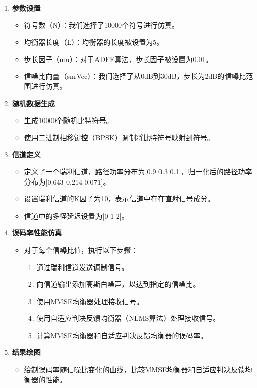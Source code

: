 \documentclass[UTF8,a4paper,12pt]{ctexart}
\numberwithin{equation}{section}
\begin{document}
\begin{enumerate}
	\item \textbf{参数设置}
	\begin{itemize}
		\item 符号数（N）：我们选择了10000个符号进行仿真。
		\item 均衡器长度（L）：均衡器的长度被设置为5。
		\item 步长因子（mu）：对于ADFE算法，步长因子被设置为0.01。
		\item 信噪比向量（snrVec）：我们选择了从0dB到30dB，步长为2dB的信噪比范围进行仿真。
	\end{itemize}
	
	\item \textbf{随机数据生成}
	\begin{itemize}
		\item 生成10000个随机比特符号。
		\item 使用二进制相移键控（BPSK）调制将比特符号映射到符号。
	\end{itemize}
	
	\item \textbf{信道定义}
	\begin{itemize}
		\item 定义了一个瑞利信道，路径功率分布为[0.9 0.3 0.1]，归一化后的路径功率分布为[0.643 0.214 0.071]。
		\item 设置瑞利信道的K因子为10，表示信道中存在直射信号成分。
		\item 信道中的多径延迟设置为[0 1 2]。
	\end{itemize}
	
	\item \textbf{误码率性能仿真}
	\begin{itemize}
		\item 对于每个信噪比值，执行以下步骤：
		\begin{enumerate}
			\item 通过瑞利信道发送调制信号。
			\item 向信道输出添加高斯白噪声，以达到指定的信噪比。
			\item 使用MMSE均衡器处理接收信号。
			\item 使用自适应判决反馈均衡器（NLMS算法）处理接收信号。
			\item 计算MMSE均衡器和自适应判决反馈均衡器的误码率。
		\end{enumerate}
	\end{itemize}
	
	\item \textbf{结果绘图}
	\begin{itemize}
		\item 绘制误码率随信噪比变化的曲线，比较MMSE均衡器和自适应判决反馈均衡器的性能。
	\end{itemize}
	

\end{enumerate}
\end{document}
